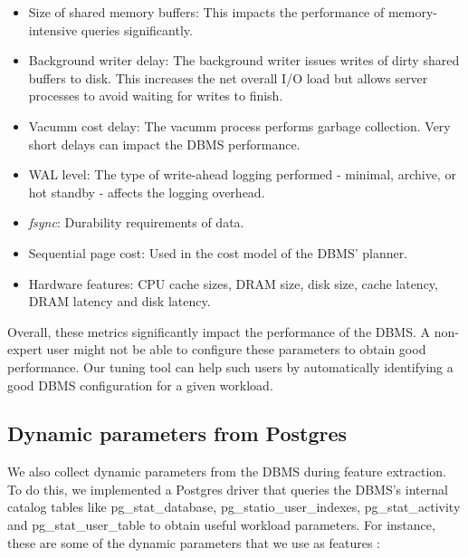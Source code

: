   \begin{itemize}
    \item {Size of shared memory buffers: This impacts the performance of
    memory-intensive queries significantly.}
    \item {Background writer delay: The background writer issues writes of
    dirty shared buffers to disk. This increases the net overall I/O load but
    allows server processes to avoid waiting for writes to finish.}
    \item {Vacumm cost delay: The vacumm process performs garbage 
    collection. Very short delays can impact the DBMS performance.}
    \item {WAL level: The type of write-ahead logging performed - minimal,
    archive, or hot standby - affects the logging overhead.}
    \item {\textit{fsync}: Durability requirements of data.}
    \item {Sequential page cost: Used in the cost model of the DBMS' planner.}
	\item {Hardware features: CPU cache sizes, DRAM size, disk size, cache latency,
	DRAM latency and disk latency.}
  \end{itemize}
  
  Overall, these metrics significantly impact the performance of the DBMS. A
  non-expert user might not be able to configure these parameters to obtain
  good performance. Our tuning tool can help such users by automatically
  identifying a good DBMS configuration for a given workload.  
  
\subsection{Dynamic parameters from Postgres}
  
  We also collect dynamic parameters from the DBMS during feature extraction.
  To do this, we implemented a Postgres driver that queries the DBMS's internal
  catalog tables like pg\_stat\_database, pg\_statio\_user\_indexes,
  pg\_stat\_activity and pg\_stat\_user\_table
  to obtain useful workload parameters. For instance, these are some of the
  dynamic parameters that we use as features :\\
  
